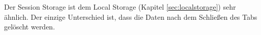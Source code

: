 
Der Session Storage ist dem Local Storage (Kapitel \ref{sec:localstorage}) sehr ähnlich. Der einzige Unterschied ist, dass die Daten nach dem Schließen des Tabs gelöscht werden. 

